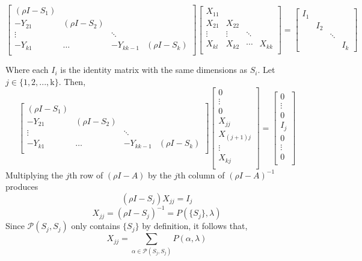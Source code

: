 \documentclass{paper}
\begin{document}
\[
\begin{bmatrix}
(\rho I - S_1) \\
-Y_{21} & (\rho I - S_2) \\
\vdots & & \ddots \\
-Y_{k1} & \hdots & -Y_{kk-1} & (\rho I - S_k) \\
\end{bmatrix}
\begin{bmatrix}
X_{11} \\
X_{21} & X_{22} \\
\vdots & \vdots & \ddots \\
X_{kl} & X_{k2} & \cdots & X_{kk} \\
\end{bmatrix}
=
\begin{bmatrix}
I_1 \\
& I_2 \\
& & \ddots \\
& & & I_k
\end{bmatrix}
\]

Where each $I_i$ is the identity matrix with the same dimensions as $S_i$. Let $j \in  \{1,2,...,$k$\}$. Then,
\[
\begin{bmatrix}
(\rho I - S_1) \\
-Y_{21} & (\rho I - S_2) \\
\vdots & & \ddots \\
-Y_{k1} & \hdots & -Y_{kk-1} & (\rho I - S_k) \\
\end{bmatrix}
\begin{bmatrix}
0 \\
\vdots \\
0 \\
X_{jj} \\
X_{(j+1)j} \\
\vdots \\
X_{kj} \\
\end{bmatrix}
= 
\begin{bmatrix}
0\\
\vdots \\
0 \\
I_j\\
0\\
\vdots\\
0\\
\end{bmatrix}
\]
Multiplying the $j$th row of $(\rho I -A)$ by the $j$th column of $(\rho I -A)^{-1}$ produces
\[
(\rho I - S_j)X_{jj} = I_j
\]
\begin{equation}
X_{jj} = (\rho I - S_j)^{-1} = P(\{S_j\},\lambda)
\end{equation}
Since $\mathcal{P}(S_j,S_j)$ only contains $\{S_j\}$ by definition, it follows that,
\[
X_{jj} = \sum_{\alpha \in \mathcal{P}(S_j,S_j)} P(\alpha,\lambda)
\]
\end{document}
